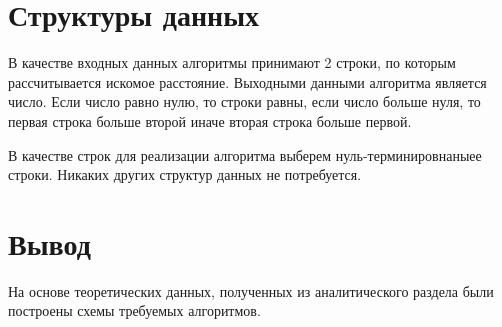         
        \newpage
    
    \section{Структуры данных}
    
        В качестве входных данных алгоритмы принимают 2 строки, по которым рассчитывается искомое расстояние. Выходными данными алгоритма является число. Если число равно нулю, то строки равны, если число больше нуля, то первая строка больше второй иначе вторая строка больше первой.
        
        В качестве строк для реализации алгоритма выберем нуль-терминировнаныее строки. Никаких других структур данных не потребуется.
        
    \section*{Вывод}
    
        На основе теоретических данных, полученных из аналитического раздела были построены схемы требуемых алгоритмов.